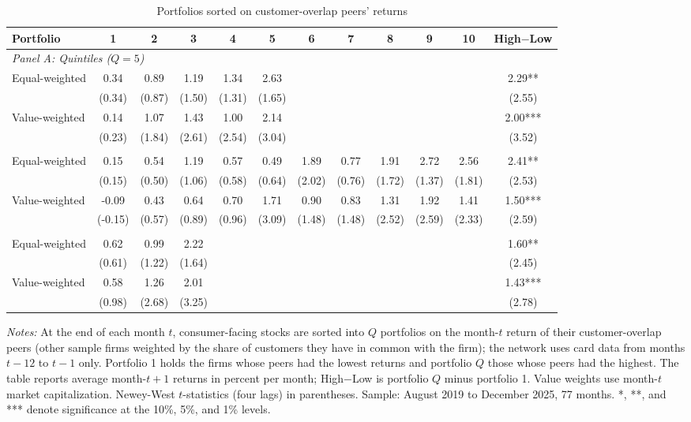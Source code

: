 \begin{table}[!htbp]\centering
\caption{Portfolios sorted on customer-overlap peers' returns}\label{tab:sorts}
\footnotesize
\begin{tabular*}{\linewidth}{@{\extracolsep{\fill}}lccccccccccc}
\toprule
Portfolio & 1 & 2 & 3 & 4 & 5 & 6 & 7 & 8 & 9 & 10 & High$-$Low \\
\midrule
\multicolumn{12}{l}{\emph{Panel A: Quintiles ($Q=5$)}} \\
Equal-weighted & 0.34 & 0.89 & 1.19 & 1.34 & 2.63 &  &  &  &  &  & 2.29** \\
 & (0.34) & (0.87) & (1.50) & (1.31) & (1.65) &  &  &  &  &  & (2.55) \\
Value-weighted & 0.14 & 1.07 & 1.43 & 1.00 & 2.14 &  &  &  &  &  & 2.00*** \\
 & (0.23) & (1.84) & (2.61) & (2.54) & (3.04) &  &  &  &  &  & (3.52) \\
\addlinespace
\multicolumn{12}{l}{\emph{Panel B: Deciles ($Q=10$)}} \\
Equal-weighted & 0.15 & 0.54 & 1.19 & 0.57 & 0.49 & 1.89 & 0.77 & 1.91 & 2.72 & 2.56 & 2.41** \\
 & (0.15) & (0.50) & (1.06) & (0.58) & (0.64) & (2.02) & (0.76) & (1.72) & (1.37) & (1.81) & (2.53) \\
Value-weighted & -0.09 & 0.43 & 0.64 & 0.70 & 1.71 & 0.90 & 0.83 & 1.31 & 1.92 & 1.41 & 1.50*** \\
 & (-0.15) & (0.57) & (0.89) & (0.96) & (3.09) & (1.48) & (1.48) & (2.52) & (2.59) & (2.33) & (2.59) \\
\addlinespace
\multicolumn{12}{l}{\emph{Panel C: Terciles ($Q=3$)}} \\
Equal-weighted & 0.62 & 0.99 & 2.22 &  &  &  &  &  &  &  & 1.60** \\
 & (0.61) & (1.22) & (1.64) &  &  &  &  &  &  &  & (2.45) \\
Value-weighted & 0.58 & 1.26 & 2.01 &  &  &  &  &  &  &  & 1.43*** \\
 & (0.98) & (2.68) & (3.25) &  &  &  &  &  &  &  & (2.78) \\
\bottomrule
\end{tabular*}
\par\vspace{4pt}\begin{minipage}{\linewidth}\scriptsize \emph{Notes:} At the end of each month $t$, consumer-facing stocks are sorted into $Q$ portfolios on the month-$t$ return of their customer-overlap peers (other sample firms weighted by the share of customers they have in common with the firm); the network uses card data from months $t-12$ to $t-1$ only. Portfolio 1 holds the firms whose peers had the lowest returns and portfolio $Q$ those whose peers had the highest. The table reports average month-$t+1$ returns in percent per month; High$-$Low is portfolio $Q$ minus portfolio 1. Value weights use month-$t$ market capitalization. Newey-West $t$-statistics (four lags) in parentheses. Sample: August 2019 to December 2025, 77 months. *, **, and *** denote significance at the 10\%, 5\%, and 1\% levels.\end{minipage}
\end{table}